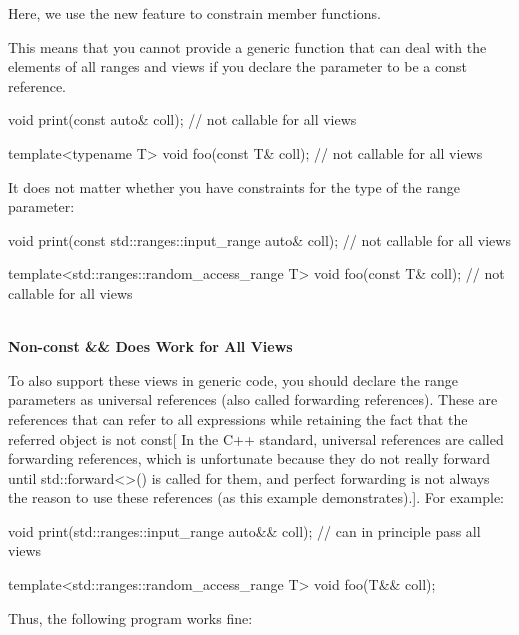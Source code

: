Here, we use the new feature to constrain member functions.

This means that you cannot provide a generic function that can deal with the elements of all ranges and views if you declare the parameter to be a const reference.

\begin{cpp}
void print(const auto& coll); // not callable for all views

template<typename T>
void foo(const T& coll); // not callable for all views
\end{cpp}

It does not matter whether you have constraints for the type of the range parameter:

\begin{cpp}
void print(const std::ranges::input_range auto& coll); // not callable for all views

template<std::ranges::random_access_range T>
void foo(const T& coll); // not callable for all views
\end{cpp}


\noindent
\hspace*{\fill} \\ %
\textbf{Non-const \&\& Does Work for All Views}

To also support these views in generic code, you should declare the range parameters as universal references (also called forwarding references). These are references that can refer to all expressions while retaining the fact that the referred object is not const[ In the C++ standard, universal references are called forwarding references, which is unfortunate because they do not really forward until std::forward<>() is called for them, and perfect forwarding is not always the reason to use these references (as this example demonstrates).]. For example:

\begin{cpp}
void print(std::ranges::input_range auto&& coll); // can in principle pass all views

template<std::ranges::random_access_range T>
void foo(T&& coll);
\end{cpp}

Thus, the following program works fine:



